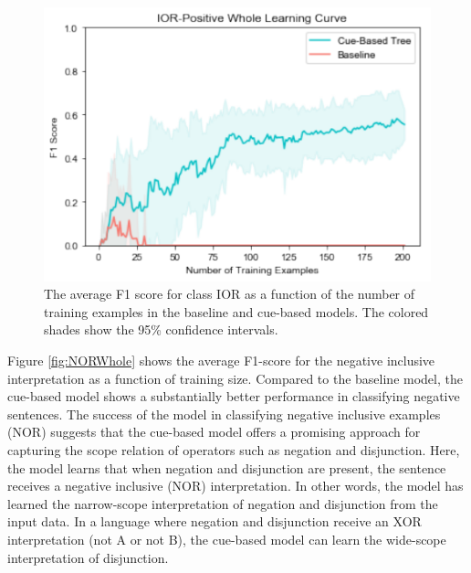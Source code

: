 \documentclass[floatsintext,man]{apa6}
\theoremstyle{definition}
\theoremstyle{definition}
\theoremstyle{definition}
\theoremstyle{remark}
\begin{document}
\begin{figure}
\centering
\includegraphics{figs/IORWhole-1.pdf}
\caption{\label{fig:IORWhole}The average F1 score for class IOR as a
function of the number of training examples in the baseline and
cue-based models. The colored shades show the 95\% confidence
intervals.}
\end{figure}

Figure \ref{fig:NORWhole} shows the average F1-score for the negative
inclusive interpretation as a function of training size. Compared to the
baseline model, the cue-based model shows a substantially better
performance in classifying negative sentences. The success of the model
in classifying negative inclusive examples (NOR) suggests that the
cue-based model offers a promising approach for capturing the scope
relation of operators such as negation and disjunction. Here, the model
learns that when negation and disjunction are present, the sentence
receives a negative inclusive (NOR) interpretation. In other words, the
model has learned the narrow-scope interpretation of negation and
disjunction from the input data. In a language where negation and
disjunction receive an XOR interpretation (not A or not B), the
cue-based model can learn the wide-scope interpretation of disjunction.
\end{document}
